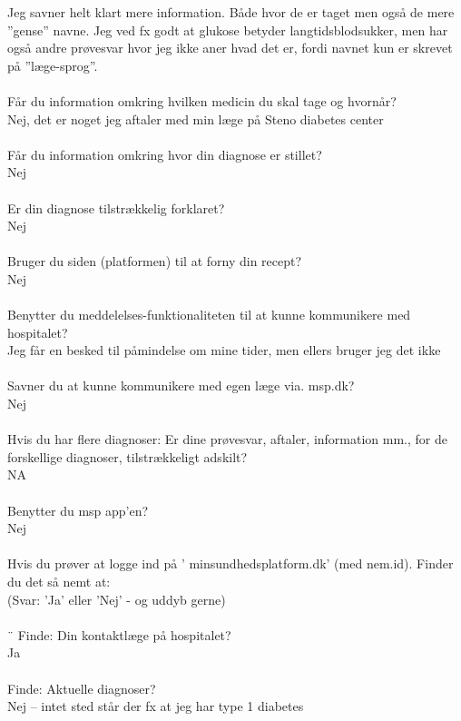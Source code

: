 Jeg savner helt klart mere information. Både hvor de er taget men også de mere ”gense” navne. Jeg ved fx godt at glukose betyder langtidsblodsukker, men har også andre prøvesvar hvor jeg ikke aner hvad det er, fordi navnet kun er skrevet på ”læge-sprog”.
\\ \\
Får du information omkring hvilken medicin du skal tage og hvornår?\\
Nej, det er noget jeg aftaler med min læge på Steno diabetes center
\\ \\
Får du information omkring hvor din diagnose er stillet?\\
Nej
\\ \\
Er din diagnose tilstrækkelig forklaret?\\
Nej
\\ \\
Bruger du siden (platformen) til at forny din recept?\\
Nej
\\ \\
Benytter du meddelelses-funktionaliteten til at kunne kommunikere med hospitalet?\\
Jeg får en besked til påmindelse om mine tider, men ellers bruger jeg det ikke
\\ \\
Savner du at kunne kommunikere med egen læge via. msp.dk?\\
Nej
\\ \\
Hvis du har flere diagnoser: Er dine prøvesvar, aftaler, information mm., for de forskellige diagnoser, tilstrækkeligt adskilt?\\
NA
\\ \\
Benytter du msp app’en?\\
Nej
\\ \\
Hvis du prøver at logge ind på ’ minsundhedsplatform.dk’ (med nem.id). Finder du det så nemt at:\\
(Svar: ’Ja’ eller ’Nej’ - og uddyb gerne)
\\ \\¨
Finde: Din kontaktlæge på hospitalet?\\
Ja
\\ \\
Finde: Aktuelle diagnoser?\\
Nej – intet sted står der fx at jeg har type 1 diabetes 
